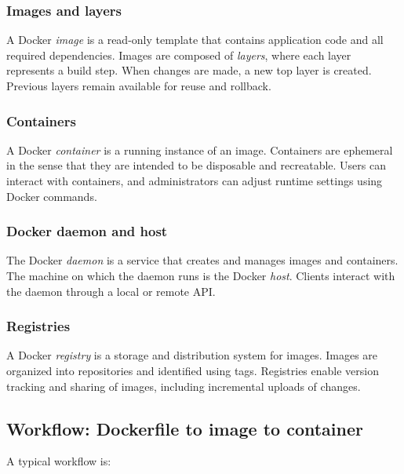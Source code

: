 \documentclass[11pt,a4paper,openany]{report}
\begin{document}
\subsubsection*{Images and layers}

A Docker \emph{image} is a read-only template that contains application code and all required dependencies. Images are composed of \emph{layers}, where each layer represents a build step. When changes are made, a new top layer is created. Previous layers remain available for reuse and rollback.

\subsubsection*{Containers}

A Docker \emph{container} is a running instance of an image. Containers are ephemeral in the sense that they are intended to be disposable and recreatable. Users can interact with containers, and administrators can adjust runtime settings using Docker commands.

\subsubsection*{Docker daemon and host}

The Docker \emph{daemon} is a service that creates and manages images and containers. The machine on which the daemon runs is the Docker \emph{host}. Clients interact with the daemon through a local or remote API.

\subsubsection*{Registries}

A Docker \emph{registry} is a storage and distribution system for images. Images are organized into repositories and identified using tags. Registries enable version tracking and sharing of images, including incremental uploads of changes.

\subsection{Workflow: Dockerfile to image to container}

A typical workflow is:
\end{document}
